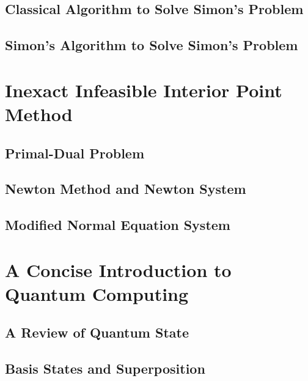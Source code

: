 \documentclass[
	11pt, %
	a4paper, %
]{LegrandOrangeBook}
\begin{document}
\subsection{Classical Algorithm to Solve Simon's Problem}


\subsection{Simon's Algorithm to Solve Simon's Problem}


\section{Inexact Infeasible Interior Point Method}
\subsection{Primal-Dual Problem}


\subsection{Newton Method and Newton System}


\subsection{Modified Normal Equation System}


\section{A Concise Introduction to Quantum Computing}
\subsection{A Review of Quantum State}


\subsection{Basis States and Superposition}

\end{document}
